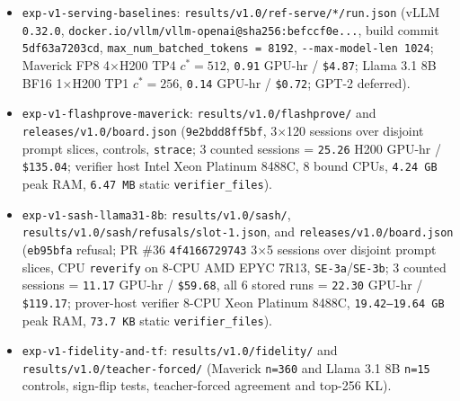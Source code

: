 \documentclass[11pt,letterpaper]{article}
\begin{document}
\begin{itemize}
\item \texttt{exp-\allowbreak{}v1-\allowbreak{}serving-\allowbreak{}baselines}: \texttt{results/\allowbreak{}v1.0/\allowbreak{}ref-\allowbreak{}serve/\allowbreak{}*/\allowbreak{}run.\allowbreak{}json} (vLLM \texttt{0.32.0}, \texttt{docker.\allowbreak{}io/\allowbreak{}vllm/\allowbreak{}vllm-\allowbreak{}openai@\allowbreak{}sha256:\allowbreak{}befccf0e...}, build commit \texttt{5df63a7203cd}, \texttt{max\_\allowbreak{}num\_\allowbreak{}batched\_\allowbreak{}tokens = 8192}, \texttt{-{}-max-\allowbreak{}model-\allowbreak{}len 1024}; Maverick FP8 4$\times$H200 TP4 $c^*=512$, \texttt{0.91} GPU-hr / \texttt{\$4.87}; Llama 3.1 8B BF16 1$\times$H200 TP1 $c^*=256$, \texttt{0.14} GPU-hr / \texttt{\$0.72}; GPT-2 deferred).
\item \texttt{exp-\allowbreak{}v1-\allowbreak{}flashprove-\allowbreak{}maverick}: \texttt{results/\allowbreak{}v1.0/\allowbreak{}flashprove/} and \texttt{releases/\allowbreak{}v1.0/\allowbreak{}board.\allowbreak{}json} (\texttt{9e2bdd8ff5bf}, 3$\times$120 sessions over disjoint prompt slices, controls, \texttt{strace}; 3 counted sessions = \texttt{25.26} H200 GPU-hr / \texttt{\$135.04}; verifier host Intel Xeon Platinum 8488C, 8 bound CPUs, \texttt{4.24 GB} peak RAM, \texttt{6.47 MB} static \texttt{verifier\_\allowbreak{}files}).
\item \texttt{exp-\allowbreak{}v1-\allowbreak{}sash-\allowbreak{}llama31-8b}: \texttt{results/\allowbreak{}v1.0/\allowbreak{}sash/}, \texttt{results/\allowbreak{}v1.0/\allowbreak{}sash/\allowbreak{}refusals/\allowbreak{}slot-1.\allowbreak{}json}, and \texttt{releases/\allowbreak{}v1.0/\allowbreak{}board.\allowbreak{}json} (\texttt{eb95bfa} refusal; PR \#36 \texttt{4f4166729743} 3$\times$5 sessions over disjoint prompt slices, CPU \texttt{reverify} on 8-CPU AMD EPYC 7R13, \texttt{SE-3a}/\texttt{SE-3b}; 3 counted sessions = \texttt{11.17} GPU-hr / \texttt{\$59.68}, all 6 stored runs = \texttt{22.30} GPU-hr / \texttt{\$119.17}; prover-host verifier 8-CPU Xeon Platinum 8488C, \texttt{19.42--19.64 GB} peak RAM, \texttt{73.7 KB} static \texttt{verifier\_\allowbreak{}files}).
\item \texttt{exp-\allowbreak{}v1-\allowbreak{}fidelity-\allowbreak{}and-\allowbreak{}tf}: \texttt{results/\allowbreak{}v1.0/\allowbreak{}fidelity/} and \texttt{results/\allowbreak{}v1.0/\allowbreak{}teacher-\allowbreak{}forced/} (Maverick \texttt{n=360} and Llama 3.1 8B \texttt{n=15} controls, sign-flip tests, teacher-forced agreement and top-256 KL).

\end{itemize}
\end{document}
